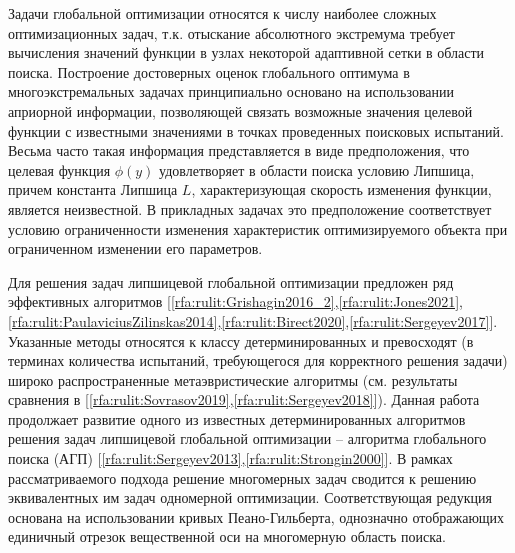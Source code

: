 \documentclass[10pt,a4paper]{book}
\begin{document}

Задачи глобальной оптимизации относятся к числу наиболее сложных оптимизационных задач, т.к. отыскание абсолютного экстремума требует вычисления значений функции в узлах некоторой адаптивной сетки в области поиска. 
Построение достоверных оценок глобального оптимума в многоэкстремальных задачах принципиально основано на использовании априорной информации, позволяющей связать возможные значения целевой функции с известными значениями в точках проведенных поисковых испытаний.
Весьма часто такая информация представляется в виде предположения, что целевая функция $\phi(y)$ удовлетворяет в области поиска условию Липшица, причем константа Липшица $L$, характеризующая скорость изменения функции, является неизвестной. В прикладных задачах это предположение соответствует условию ограниченности изменения характеристик оптимизируемого объекта при ограниченном изменении его параметров. 

Для решения задач липшицевой глобальной оптимизации предложен ряд эффективных алгоритмов 
[\ref{rfa:rulit:Grishagin2016_2},\ref{rfa:rulit:Jones2021},\ref{rfa:rulit:PaulaviciusZilinskas2014},\ref{rfa:rulit:Birect2020},\ref{rfa:rulit:Sergeyev2017}]. Указанные методы относятся к классу детерминированных и превосходят (в терминах количества испытаний, требующегося для корректного решения задачи) широко распространенные метаэвристические алгоритмы (см. результаты сравнения в [\ref{rfa:rulit:Sovrasov2019},\ref{rfa:rulit:Sergeyev2018}]).
Данная работа продолжает развитие одного из известных детерминированных алгоритмов решения задач липшицевой глобальной оптимизации -- алгоритма глобального поиска (АГП) [\ref{rfa:rulit:Sergeyev2013},\ref{rfa:rulit:Strongin2000}]. В рамках рассматриваемого подхода решение многомерных задач сводится к решению эквивалентных им задач одномерной оптимизации. Соответствующая редукция основана на использовании кривых Пеано-Гильберта, однозначно отображающих единичный отрезок вещественной оси на многомерную область поиска. 
 
\end{document}
